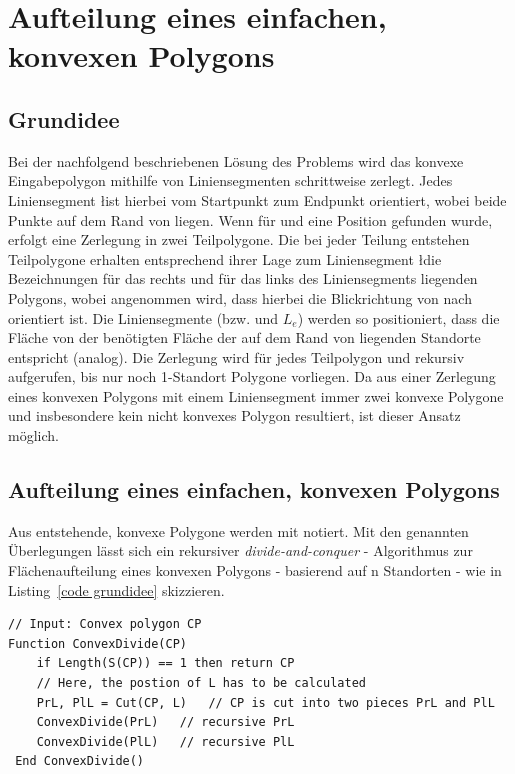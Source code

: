 \documentclass[ngerman]{seminarbeitrag}
\begin{document}
\section{Aufteilung eines einfachen, konvexen Polygons}\label{konvex}
\subsection{Grundidee}\label{grundidee konvex}
Bei der nachfolgend beschriebenen Lösung des Problems wird das konvexe Eingabepolygon \cp mithilfe von Liniensegmenten schrittweise zerlegt. Jedes Liniensegment
\l ist hierbei vom Startpunkt \ls zum Endpunkt \Le orientiert, wobei beide Punkte auf dem Rand von \cp liegen. Wenn für \ls und \Le eine Position gefunden wurde, erfolgt eine Zerlegung in zwei Teilpolygone.
Die bei jeder Teilung entstehen Teilpolygone erhalten entsprechend ihrer Lage zum Liniensegment \l die Bezeichnungen \prl für das rechts und \pll für das links
des Liniensegments liegenden Polygons, wobei angenommen wird, dass hierbei die Blickrichtung von \ls nach \Le orientiert ist. Die Liniensegmente (bzw. \ls und $L_{e}$) werden so positioniert, dass die Fläche von \prl der benötigten Fläche der auf dem Rand von \prl liegenden Standorte entspricht (\pll analog). Die Zerlegung wird für jedes Teilpolygon \prl und \pll rekursiv aufgerufen, bis nur noch 1-Standort Polygone vorliegen. Da aus einer Zerlegung eines konvexen Polygons mit einem Liniensegment immer zwei konvexe Polygone und insbesondere kein nicht konvexes Polygon resultiert, ist dieser Ansatz möglich.

\subsection{Aufteilung eines einfachen, konvexen Polygons}\label{aufteilung konvex}
Aus \cp entstehende, konvexe Polygone werden mit \cpi notiert. Mit den genannten Überlegungen lässt sich ein rekursiver \emph{divide-and-conquer} - Algorithmus
zur Flächenaufteilung eines konvexen Polygons - basierend auf n Standorten - wie in Listing~\ref{code grundidee} skizzieren.

\begin{lstlisting}[float,caption={Die Grundidee hinter dem Algorithmus \con}, frame=single, label=code grundidee]
// Input: Convex polygon CP
Function ConvexDivide(CP)
    if Length(S(CP)) == 1 then return CP
    // Here, the postion of L has to be calculated
    PrL, PlL = Cut(CP, L)   // CP is cut into two pieces PrL and PlL
    ConvexDivide(PrL)   // recursive PrL
    ConvexDivide(PlL)   // recursive PlL
 End ConvexDivide() 
\end{lstlisting}
\end{document}
